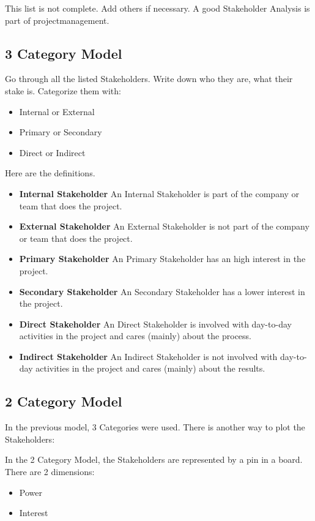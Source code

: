 \documentclass[10pt]{report}
\begin{document}
This list is not complete. Add others if necessary. A good Stakeholder Analysis is part of projectmanagement.

\subsection{3 Category Model}

Go through all the listed Stakeholders. Write down who they are, what their stake is. Categorize them with:

\begin{itemize}
	\item Internal or External
	\item Primary or Secondary
	\item Direct or Indirect
\end{itemize}

Here are the definitions.

\begin{itemize}
	\item \textbf{Internal Stakeholder} An Internal Stakeholder is part of the company or team that does the project.
	\item \textbf{External Stakeholder} An External Stakeholder is not part of the company or team that does the project.
	\item \textbf{Primary Stakeholder} An Primary Stakeholder has an high interest in the project.
	\item \textbf{Secondary Stakeholder} An Secondary Stakeholder has a lower interest in the project.
	\item \textbf{Direct Stakeholder} An Direct Stakeholder is involved with day-to-day activities in the project and cares (mainly) about the process.
	\item \textbf{Indirect Stakeholder} An Indirect Stakeholder is not involved with day-to-day activities in the project and cares (mainly) about the results.
\end{itemize}

\subsection{2 Category Model}

In the previous model, 3 Categories were used. There is another way to plot the Stakeholders:

In the 2 Category Model, the Stakeholders are represented by a pin in a board. There are 2 dimensions:

\begin{itemize}
	\item Power
	\item Interest
\end{itemize}
\end{document}
